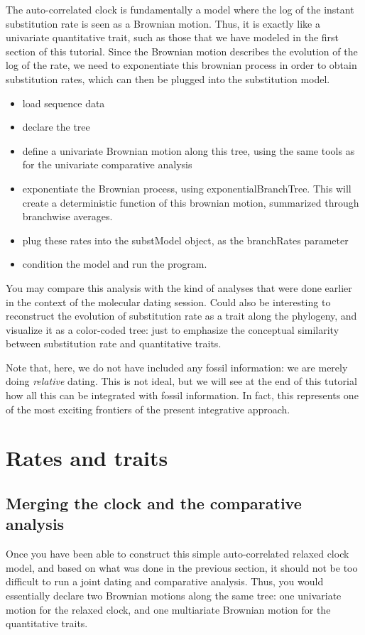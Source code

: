 \documentclass[usletter]{article}
\begin{document}
The auto-correlated clock is fundamentally a model where the log of the instant substitution rate is seen as a Brownian motion. Thus, it is exactly like a univariate quantitative trait, such as those that we have modeled in the first section of this tutorial. Since the Brownian motion describes the evolution of the log of the rate, we need to exponentiate this brownian process in order to obtain substitution rates, which can then be plugged into the substitution model.
\begin{itemize}
\item
load sequence data
\item
declare the tree
\item
define a univariate Brownian motion along this tree, using the same tools as for the univariate comparative analysis
\item
exponentiate the Brownian process, using exponentialBranchTree. This will create a deterministic function of this brownian motion, summarized through branchwise averages.
\item
plug these rates into the substModel object, as the branchRates parameter
\item
condition the model and run the program.
\end{itemize}
You may compare this analysis with the kind of analyses that were done earlier in the context of the molecular dating session. Could also be interesting to reconstruct the evolution of substitution rate as a trait along the phylogeny, and visualize it as a color-coded tree: just to emphasize the conceptual similarity between substitution rate and quantitative traits.

Note that, here, we do not have included any fossil information: we are merely doing \emph{relative} dating. This is not ideal, but we will see at the end of this tutorial how all this can be integrated with fossil information. In fact, this represents one of the most exciting frontiers of the present integrative approach.

\section{Rates and traits}

\subsection{Merging the clock and the comparative analysis}

Once you have been able to construct this simple auto-correlated relaxed clock model, and based on what was done in the previous section, it should not be too difficult to run a joint dating and comparative analysis. Thus, you would essentially declare two Brownian motions along the same tree: one univariate motion for the relaxed clock, and one multiariate Brownian motion for the quantitative traits.
\end{document}
